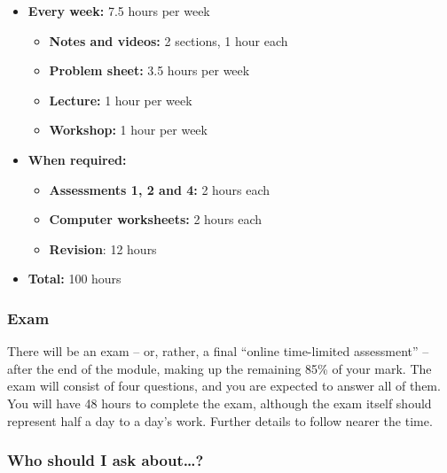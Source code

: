 \documentclass[
  a4paper,
]{article}
\providecommand{\tightlist}{%
  \setlength{\itemsep}{0pt}\setlength{\parskip}{0pt}}
\theoremstyle{definition}
\theoremstyle{definition}
\theoremstyle{definition}
\theoremstyle{remark}
\begin{document}
\begin{itemize}
\tightlist
\item
  \textbf{Every week:} 7.5 hours per week

  \begin{itemize}
  \tightlist
  \item
    \textbf{Notes and videos:} 2 sections, 1 hour each
  \item
    \textbf{Problem sheet:} 3.5 hours per week
  \item
    \textbf{Lecture:} 1 hour per week
  \item
    \textbf{Workshop:} 1 hour per week
  \end{itemize}
\item
  \textbf{When required:}

  \begin{itemize}
  \tightlist
  \item
    \textbf{Assessments 1, 2 and 4:} 2 hours each
  \item
    \textbf{Computer worksheets:} 2 hours each
  \item
    \textbf{Revision}: 12 hours
  \end{itemize}
\item
  \textbf{Total:} 100 hours
\end{itemize}

\hypertarget{exam}{%
\subsubsection*{Exam}\label{exam}}

There will be an exam -- or, rather, a final ``online time-limited assessment'' -- after the end of the module, making up the remaining 85\% of your mark. The exam will consist of four questions, and you are expected to answer all of them. You will have 48 hours to complete the exam, although the exam itself should represent half a day to a day's work. Further details to follow nearer the time.

\hypertarget{ask}{%
\subsubsection*{Who should I ask about\ldots?}\label{ask}}
\end{document}
